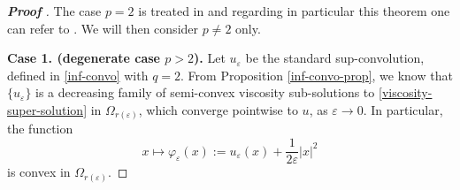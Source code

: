 \documentclass[12pt]{amsart}
\newcommand{\1}{\mathbf 1}
\begin{document}
\begin{proof}[\bf Proof ]
The case $p=2$ is treated in \cite{Andrea-Paolo2024} and regarding in particular this theorem one can refer to \cite{Ishii}. We will then consider $p\neq 2$ only.

{\bf Case 1. (degenerate case $p> 2$).} Let  $u_{\varepsilon}$ be the standard sup-convolution, defined in \eqref{inf-convo} with $q=2$.
From Proposition \ref{inf-convo-prop},
we know that $\{u_\varepsilon\}$ is a decreasing family of semi-convex viscosity sub-solutions to \eqref{viscosity-super-solution} in $\Omega_{r(\varepsilon)}$, which converge pointwise to $u$, as $\varepsilon\rightarrow 0$. In particular, the function
\begin{equation}\label{varphi}
x\mapsto \varphi_\varepsilon(x):=u_\varepsilon (x)+\frac{1}{2\varepsilon}|x|^2
\end{equation}
is convex in $\Omega_{r(\varepsilon)}$.


\end{proof}
\end{document}
